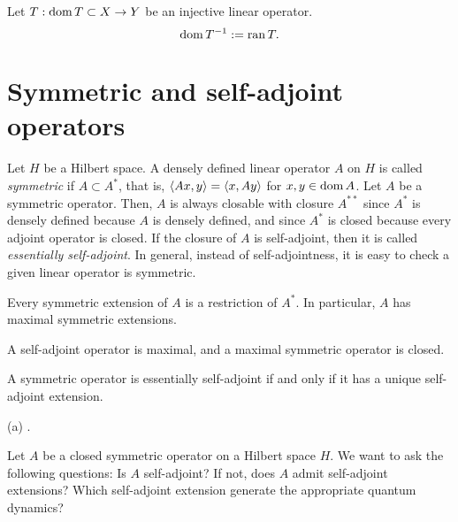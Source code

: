 \documentclass{../../large}
\begin{document}
\begin{prb}
\end{prb}

\begin{prb}
\end{prb}

\begin{prb}
Let $T:\operatorname{dom} T\subset X\to Y$ be an injective linear operator.
\[\operatorname{dom} T^{-1}:=\operatorname{ran} T.\]
\end{prb}



\section{Symmetric and self-adjoint operators}


\begin{prb}
Let $H$ be a Hilbert space.
A densely defined linear operator $A$ on $H$ is called \emph{symmetric} if $A\subset A^*$, that is, $\langle Ax,y\rangle=\langle x,Ay\rangle$ for $x,y\in\operatorname{dom} A$.
Let $A$ be a symmetric operator.
Then, $A$ is always closable with closure $A^{**}$ since $A^*$ is densely defined because $A$ is densely defined, and since $A^*$ is closed because every adjoint operator is closed.
If the closure of $A$ is self-adjoint, then it is called \emph{essentially self-adjoint}.
In general, instead of self-adjointness, it is easy to check a given linear operator is symmetric.
\begin{parts}
\item Every symmetric extension of $A$ is a restriction of $A^*$. In particular, $A$ has maximal symmetric extensions.
\item A self-adjoint operator is maximal, and a maximal symmetric operator is closed.
\item A symmetric operator is essentially self-adjoint if and only if it has a unique self-adjoint extension.
\end{parts}
\end{prb}
\begin{pf}
(a) .
\end{pf}


Let $A$ be a closed symmetric operator on a Hilbert space $H$.
We want to ask the following questions:
Is $A$ self-adjoint?
If not, does $A$ admit self-adjoint extensions?
Which self-adjoint extension generate the appropriate quantum dynamics?
\end{document}
